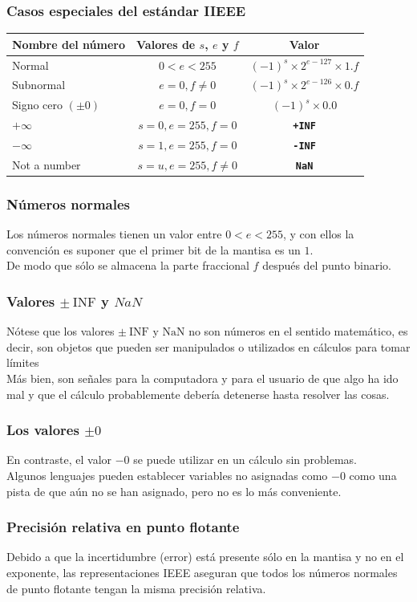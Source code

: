 \begin{frame}
\frametitle{Casos especiales del estándar IIEEE}
\begin{table}
\fontsize{10}{10}\selectfont
\begin{tabular}{l c c}
\hline
Nombre del número & Valores de $s$, $e$ y $f$ & Valor \\ \hline
Normal & $0 < e < 255$ & $(-1)^{s} \times 2^{e-127} \times 1.f$ \\ \hline
Subnormal & $e = 0, f \neq 0$ & $(-1)^{s} \times 2^{e-126} \times 0.f$ \\ \hline
Signo cero $(\pm 0)$ & $e = 0, f = 0$ & $(-1)^{s} \times 0.0$ \\ \hline
$+ \infty$ & $s = 0, e=255, f = 0$ & \textbf{\texttt{+INF}} \\ \hline
$- \infty$ & $s = 1, e=255, f = 0$ & \textbf{\texttt{-INF}} \\ \hline
Not a number & $s = u, e=255, f \neq 0$ & \textbf{\texttt{NaN}} \\ \hline
\end{tabular}
\end{table}
\end{frame}
\begin{frame}
\frametitle{Números normales}
Los números normales tienen un valor entre $0 < e < 255$, y con ellos la convención es suponer que el primer bit de la mantisa es un $1$.
\\
\bigskip
De modo que sólo se almacena la parte fraccional $f$ después del punto binario. 
\end{frame}
\begin{frame}
\frametitle{Valores $\pm \: \text{INF}$ y $NaN$ }
Nótese que los valores $\pm \: \text{INF}$ y $\text{NaN}$ no son números en el sentido matemático, es decir, son objetos que pueden ser manipulados o utilizados en cálculos para tomar límites
\\
\bigskip
\pause
Más bien, son señales para la computadora y para el usuario de que algo ha ido mal y que el cálculo probablemente debería detenerse hasta resolver las cosas.
\end{frame}
\begin{frame}
\frametitle{Los valores $\pm 0$}
En contraste, el valor $-0$ se puede utilizar en un cálculo sin problemas.
\\
\bigskip
Algunos lenguajes pueden establecer variables no asignadas como $-0$ como una pista de que aún no se han asignado, pero no es lo más conveniente.
\end{frame}
\begin{frame}
\frametitle{Precisión relativa en punto flotante}
Debido a que la incertidumbre (error) está presente sólo en la mantisa y no en el exponente, las representaciones IEEE aseguran que todos los números normales de punto flotante tengan la misma precisión relativa.
\end{frame}
